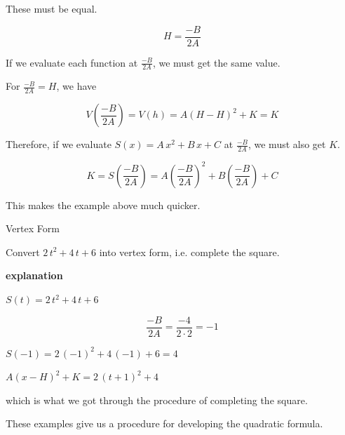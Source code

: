 \documentclass{ximera}
\begin{document}
These must be equal.

\[
H = \frac{-B}{2 A}
\]



If we evaluate each function at $\frac{-B}{2 A}$, we must get the same value.  

For $\frac{-B}{2 A}  = H$, we have 

\[
V\left( \frac{-B}{2 A} \right) = V(h) = A (H - H)^2 + K = K
\]

Therefore, if we evaluate $S(x) = A \, x^2 + B \, x + C$ at $\frac{-B}{2 A}$, we must also get $K$.



\[
K = S\left( \frac{-B}{2 A} \right) = A \left( \frac{-B}{2 A} \right)^2 + B \left( \frac{-B}{2 A} \right) + C 
\]







This makes the example above much quicker.





\begin{example} Vertex Form



Convert $2 \, t^2 + 4 \, t + 6$ into vertex form, i.e. complete the square.


\textbf{\textcolor{red!75!green}{explanation}} 


$S(t) = 2 \, t^2 + 4 \, t + 6$


\[
\frac{-B}{2 A} = \frac{-4}{2 \cdot 2} = -1
\]


$S(-1) = 2 \, (-1)^2 + 4 \, (-1) + 6 = 4$



$A (x - H)^2 + K = 2 \, (t+1)^2 + 4$

which is what we got through the procedure of completing the square.





\end{example}




These examples give us a procedure for developing the quadratic formula. 
\end{document}
